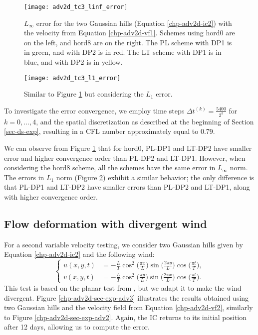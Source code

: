 \begin{figure}[!htb]
\centering
\texttt{[image: adv2d\_tc3\_linf\_error]}
\caption{$L_{\infty}$ error for the two Gaussian hills (Equation \ref{chp-adv2d-ic2})
with the velocity from Equation \eqref{chp-adv2d-vf1}.
Schemes using hord0 are on the left, and hord8 are on the right.
The PL scheme with DP1 is in green, and with DP2 is in red. 
The LT scheme with DP1 is in blue, and with DP2 is in yellow.
\label{chp-adv2d-sec-exp-adv2-error-linf}}
\end{figure}
\begin{figure}[!htb]
\centering
\texttt{[image: adv2d\_tc3\_l1\_error]}
\caption{Similar to Figure \ref{chp-adv2d-sec-exp-adv2-error-linf} but considering the $L_1$ error.
\label{chp-adv2d-sec-exp-adv2-error-l1}}
\end{figure}

To investigate the error convergence, we employ time steps $\Delta t^{(k)}=\frac{5400}{2^{k}}$ for 
$k = 0, \ldots, 4$, and the spatial discretization as described at the beginning of Section \ref{sec-ds-exp},
resulting in a CFL number approximately equal to 0.79.

We can observe from Figure \ref{chp-adv2d-sec-exp-adv2-error-linf} that for hord0, PL-DP1 and LT-DP2 have smaller
error and higher convergence order than PL-DP2 and LT-DP1.
However, when considering the hord8 scheme, all the schemes have the same error in $L_{\infty}$ norm.
The errors in $L_{1}$ norm (Figure \ref{chp-adv2d-sec-exp-adv2-error-l1}) exhibit a similar behavior; the only difference is 
that PL-DP1 and LT-DP2 have smaller errors than PL-DP2 and LT-DP1, along with higher convergence order.

\subsection{Flow deformation with divergent wind}
\label{2d-adv-divflow}
For a second variable velocity testing, we consider two Gaussian hills given by Equation 
\eqref{chp-adv2d-ic2} and the following wind:
\begin{equation}
	\label{chp-adv2d-vf2}
	\begin{cases}
		u(x,y,t) &= -\frac{L}{T} \cos^2\big(\frac{\pi x}{L}\big) \sin\big(\frac{2\pi y}{L}\big) \cos\big(\frac{\pi t}{T}\big), \\
		v(x,y,t) &= -\frac{L}{T} \cos^2\big(\frac{\pi y}{L}\big) \sin\big(\frac{2\pi x}{L}\big) \cos\big(\frac{\pi t}{T}\big).
	\end{cases}
\end{equation}
This test is based on the planar test from \citet{nair:2010}, but we adapt it to make the wind divergent.
Figure \ref{chp-adv2d-sec-exp-adv3} illustrates the results obtained using two Gaussian hills and the velocity field 
from Equation \eqref{chp-adv2d-vf2}, similarly to Figure  \ref{chp-adv2d-sec-exp-adv2}.
Again, the IC returns to its initial position after 12 days, allowing us to compute the error.

